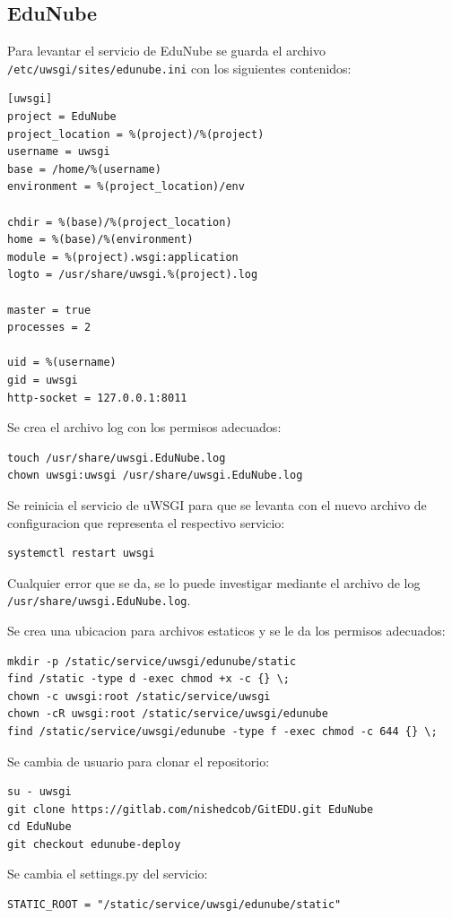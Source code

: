 \subsection{EduNube}
Para levantar el servicio de EduNube se guarda el archivo \\
\texttt{/etc/uwsgi/sites/edunube.ini} con los siguientes contenidos:
\begin{lstlisting}
[uwsgi]
project = EduNube
project_location = %(project)/%(project)
username = uwsgi
base = /home/%(username)
environment = %(project_location)/env

chdir = %(base)/%(project_location)
home = %(base)/%(environment)
module = %(project).wsgi:application
logto = /usr/share/uwsgi.%(project).log

master = true
processes = 2

uid = %(username)
gid = uwsgi
http-socket = 127.0.0.1:8011
\end{lstlisting}

Se crea el archivo log con los permisos adecuados:
\begin{lstlisting}
touch /usr/share/uwsgi.EduNube.log
chown uwsgi:uwsgi /usr/share/uwsgi.EduNube.log
\end{lstlisting}

Se reinicia el servicio de uWSGI para que se levanta con el nuevo archivo de configuracion que representa el respectivo servicio:
\begin{lstlisting}
systemctl restart uwsgi
\end{lstlisting}
Cualquier error que se da, se lo puede investigar mediante el archivo de log \\ \texttt{/usr/share/uwsgi.EduNube.log}.

Se crea una ubicacion para archivos estaticos y se le da los permisos adecuados:
\begin{lstlisting}[breaklines=true]
mkdir -p /static/service/uwsgi/edunube/static
find /static -type d -exec chmod +x -c {} \;
chown -c uwsgi:root /static/service/uwsgi
chown -cR uwsgi:root /static/service/uwsgi/edunube
find /static/service/uwsgi/edunube -type f -exec chmod -c 644 {} \;
\end{lstlisting}

Se cambia de usuario para clonar el repositorio:
\begin{lstlisting}
su - uwsgi
git clone https://gitlab.com/nishedcob/GitEDU.git EduNube
cd EduNube
git checkout edunube-deploy
\end{lstlisting}

Se cambia el settings.py del servicio:
\lstset{language=Python}
\begin{lstlisting}
STATIC_ROOT = "/static/service/uwsgi/edunube/static"
\end{lstlisting}
\lstset{language=Bash}

